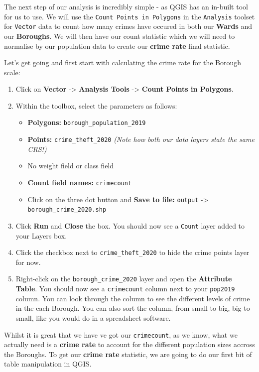 \documentclass[
]{book}
\providecommand{\tightlist}{%
  \setlength{\itemsep}{0pt}\setlength{\parskip}{0pt}}
\begin{document}
The next step of our analysis is incredibly simple - as QGIS has an in-built tool for us to use. We will use the \texttt{Count\ Points\ in\ Polygons} in the \texttt{Analysis} toolset for \texttt{Vector} data to count how many crimes have occured in both our \textbf{Wards} and our \textbf{Boroughs}. We will then have our count statistic which we will need to normalise by our population data to create our \textbf{crime rate} final statistic.

Let's get going and first start with calculating the crime rate for the Borough scale:

\begin{enumerate}
\def\labelenumi{\arabic{enumi}.}
\item
  Click on \textbf{Vector} -\textgreater{} \textbf{Analysis Tools} -\textgreater{} \textbf{Count Points in Polygons}.
\item
  Within the toolbox, select the parameters as follows:

  \begin{itemize}
  \tightlist
  \item
    \textbf{Polygons:} \texttt{borough\_population\_2019}
  \item
    \textbf{Points:} \texttt{crime\_theft\_2020} \emph{(Note how both our data layers state the same CRS!)}
  \item
    No weight field or class field
  \item
    \textbf{Count field names:} \texttt{crimecount}
  \item
    Click on the three dot button and \textbf{Save to file:} \texttt{output} -\textgreater{} \texttt{borough\_crime\_2020.shp}
  \end{itemize}
\item
  Click \textbf{Run} and \textbf{Close} the box. You should now see a \texttt{Count} layer added to your Layers box.
\item
  Click the checkbox next to \texttt{crime\_theft\_2020} to hide the crime points layer for now.
\item
  Right-click on the \texttt{borough\_crime\_2020} layer and open the \textbf{Attribute Table}. You should now see a \texttt{crimecount} column next to your \texttt{pop2019} column. You can look through the column to see the different levels of crime in the each Borough. You can also sort the column, from small to big, big to small, like you would do in a spreadsheet software.
\end{enumerate}

Whilst it is great that we have ve got our \texttt{crimecount}, as we know, what we actually need is a \textbf{crime rate} to account for the different population sizes accross the Boroughs. To get our \textbf{crime rate} statistic, we are going to do our first bit of table manipulation in QGIS.
\end{document}
